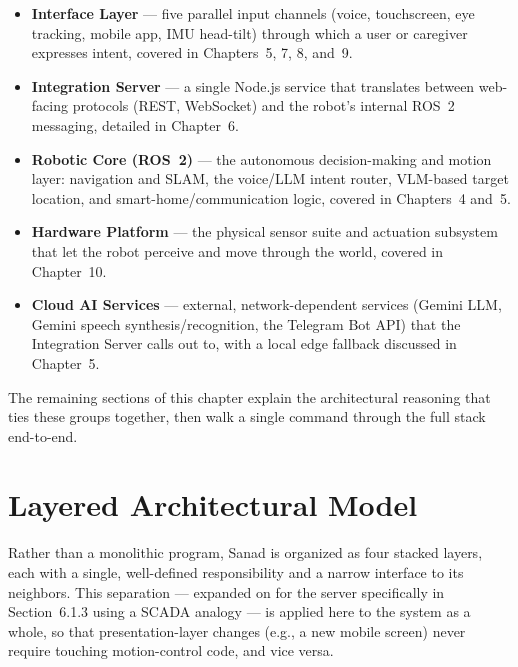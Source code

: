\begin{itemize}
    \item \textbf{Interface Layer} --- five parallel input channels (voice, touchscreen, eye tracking, mobile app, IMU head-tilt) through which a user or caregiver expresses intent, covered in Chapters~5, 7, 8, and~9.
    \item \textbf{Integration Server} --- a single Node.js service that translates between web-facing protocols (REST, WebSocket) and the robot's internal ROS~2 messaging, detailed in Chapter~6.
    \item \textbf{Robotic Core (ROS~2)} --- the autonomous decision-making and motion layer: navigation and SLAM, the voice/LLM intent router, VLM-based target location, and smart-home/communication logic, covered in Chapters~4 and~5.
    \item \textbf{Hardware Platform} --- the physical sensor suite and actuation subsystem that let the robot perceive and move through the world, covered in Chapter~10.
    \item \textbf{Cloud AI Services} --- external, network-dependent services (Gemini LLM, Gemini speech synthesis/recognition, the Telegram Bot API) that the Integration Server calls out to, with a local edge fallback discussed in Chapter~5.
\end{itemize}

The remaining sections of this chapter explain the architectural reasoning that ties these groups together, then walk a single command through the full stack end-to-end.

\section{Layered Architectural Model}
\label{sec:arch_layers}

Rather than a monolithic program, Sanad is organized as four stacked layers, each with a single, well-defined responsibility and a narrow interface to its neighbors. This separation --- expanded on for the server specifically in Section~6.1.3 using a SCADA analogy --- is applied here to the system as a whole, so that presentation-layer changes (e.g., a new mobile screen) never require touching motion-control code, and vice versa.

